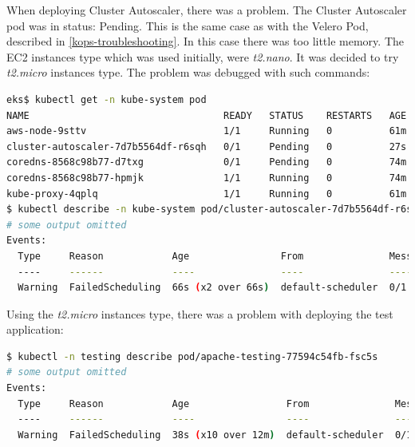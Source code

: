 When deploying Cluster Autoscaler, there was a problem. The Cluster Autoscaler pod was in status: Pending. This is the same case as with the Velero Pod, described in \ref{kops-troubleshooting}. In this case there was too little memory. The EC2 instances type which was used initially, were \textit{t2.nano}. It was decided to try \textit{t2.micro} instances type. The problem was debugged with such commands:
\begin{lstlisting}[basicstyle=\tiny,caption={TODO},captionpos=b,language=Bash,xleftmargin=1cm]
eks$ kubectl get -n kube-system pod
NAME                                  READY   STATUS    RESTARTS   AGE
aws-node-9sttv                        1/1     Running   0          61m
cluster-autoscaler-7d7b5564df-r6sqh   0/1     Pending   0          27s
coredns-8568c98b77-d7txg              0/1     Pending   0          74m
coredns-8568c98b77-hpmjk              1/1     Running   0          74m
kube-proxy-4qplq                      1/1     Running   0          61m
$ kubectl describe -n kube-system pod/cluster-autoscaler-7d7b5564df-r6sqh
# some output omitted
Events:
  Type     Reason            Age                From               Message
  ----     ------            ----               ----               -------
  Warning  FailedScheduling  66s (x2 over 66s)  default-scheduler  0/1 nodes are available: 1 Insufficient memory.
\end{lstlisting}

Using the \textit{t2.micro} instances type, there was a problem with deploying the test application:
\begin{lstlisting}[basicstyle=\tiny,caption={TODO},captionpos=b,language=Bash,xleftmargin=1cm]
$ kubectl -n testing describe pod/apache-testing-77594c54fb-fsc5s
# some output omitted
Events:
  Type     Reason            Age                 From               Message
  ----     ------            ----                ----               -------
  Warning  FailedScheduling  38s (x10 over 12m)  default-scheduler  0/1 nodes are available: 1 Insufficient pods.
\end{lstlisting}

